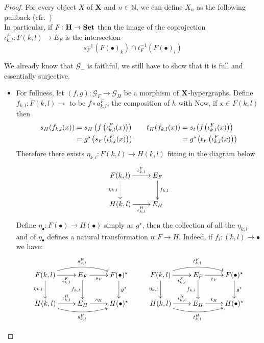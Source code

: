 \documentclass[runningheads,envcountsect]{llncs}
\def\X{\textbf {\textup{X}}}
\newcommand{\catname}[1]{\textbf{\textup{#1}}}
\begin{document}
\begin{proof}
	
	
	
	For every object $X$ of $\X$ and $n\in \mathbb{N}$, we can define $X_n$ as the following pullback (cfr.~)
	\[\]
	In particular, if $F\colon \catname{H}\to \catname{Set}$ then the image of the coprojection $\iota^{F}_{k,l}\colon F(k,l)\to E_F$ is the intersection
	\[s^{-1}_F\left(F(\bullet)_{k}\right)\cap t^{-1}_F\left(F(\bullet)_{l}\right) \]
	
We already know that $\mathcal{G}_{-}$ is faithful, we still have to show that it is full and essentially surjective.
	\begin{itemize}
		\item For fullness, let $(f,g)\colon \mathcal{G}_F\to \mathcal{G}_{H}$ be a morphism of $\X$-hypergraphs. Define $f_{k,l}\colon F(k,l)\to $ to be $f\circ a^F_{k,l}$, the composition of $h$ with Now, if $x\in F(k,l)$ then 
		\[\begin{split}
			s_H (f_{k,l} (x))&=s_H \left(f \left(\iota^F_{k,l} (x)\right)\right)\\&=g^{\star}\hspace{-1pt}\left(s_{F} \hspace{-1pt}\left(\iota^F_{k,l} (x)\right)\right)
		\end{split}\qquad \begin{split}
			t_H (f_{k,l} (x))&=s_t\hspace{-1pt} \left(f \hspace{-1pt}\left(\iota^F_{k,l} (x)\right)\right)\\&=g^{\star}\hspace{-1pt} \left(t_{F}\hspace{-1pt} \left(\iota^F_{k,l} (x)\right)\right)
		\end{split}\]
		Therefore there exists $\eta_{k,l}\colon F(k,l)\to H(k,l)$ fitting in the diagram below
		\[\xymatrix{F(k,l) \ar[r]^-{\iota^{F}_{k,l}} \ar@{.>}[d]_{\eta_{k,l}}& E_F \ar[d]^{f_{k,l}}\\ H(k,l) \ar[r]_-{\iota^{H}_{k,l}}& E_H}\]
		Define $\eta_{\bullet}\colon F(\bullet)\to H(\bullet)$ simply as $g^\star$, then  the collection of all the $\eta_{k,l}$ and of $\eta_\bullet$ defines a natural transformation $\eta\colon F\to H$. Indeed, if $f_i\colon (k,l)\to \bullet$ we have:
		\[\xymatrix{F(k,l) \ar@/^.4cm/[rr]^{s^F_{k,l}} \ar[r]_-{\iota^{F}_{k,l}} \ar[d]_{\eta_{k,l}}& E_F \ar[d]_{f_{k,l}} \ar[r]_-{s_F}& F(\bullet)^\star \ar[d]^{g^\star}&F(k,l) \ar@/^.4cm/[rr]^{t^F_{k,l}}\ar[r]_-{\iota^{F}_{k,l}} \ar[d]_{\eta_{k,l}}& E_F \ar[d]_{f_{k,l}} \ar[r]_-{t_F}& F(\bullet)^\star \ar[d]^{g^\star}\\ H(k,l) \ar@/_.4cm/[rr]_{s^H_{k,l}} \ar[r]^-{\iota^{H}_{k,l}}& E_H \ar[r]^-{s_H}& H(\bullet)^\star& H(k,l) \ar@/_.4cm/[rr]_{t^H_{k,l}} \ar[r]^-{\iota^{H}_{k,l}}& E_H \ar[r]^-{t_H}& H(\bullet)^\star}\]

\end{itemize}
\end{proof}
\end{document}
